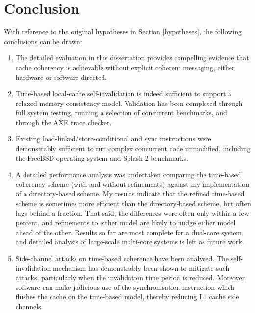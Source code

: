 	
	\section{Conclusion}
		With reference to the original hypotheses in Section \ref{hypotheses}, the following conclusions can be drawn:
	
		\begin{enumerate}
			\item The detailed evaluation in this dissertation provides compelling evidence that cache coherency is achievable without explicit coherent messaging, either hardware or software directed.  
			\item Time-based local-cache self-invalidation is indeed sufficient to support a relaxed memory consistency model. Validation has been completed through full system testing, running a selection of concurrent benchmarks, and through the AXE trace checker.
			\item Existing load-linked/store-conditional and sync instructions were demonstrably sufficient to run complex concurrent code unmodified, including the FreeBSD operating system and Splash-2 benchmarks.
			\item A detailed performance analysis was undertaken comparing the time-based coherency scheme (with and without refinements) against my implementation of a directory-based scheme. My results indicate that the refined time-based scheme is sometimes more efficient than the directory-based scheme, but often lags behind a fraction. That said, the differences were often only within a few percent, and refinements to either model are likely to nudge either model ahead of the other. Results so far are most complete for a dual-core system, and detailed analysis of large-scale multi-core systems is left as future work.
			\item Side-channel attacks on time-based coherence have been analysed.  The self-invalidation mechanism has demonstrably been shown to mitigate such attacks, particularly when the invalidation time period is reduced.  Moreover, software can make judicious use of the synchronisation instruction which flushes the cache on the time-based model, thereby reducing L1 cache side channels.
			\end{enumerate}
	
